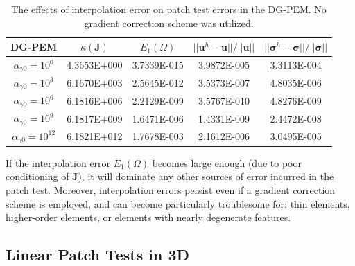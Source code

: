 \begin{table}[!ht]
  \begin{center}
    \begin{tabular}{| c || c | c | c | c |}
    \hline
    DG-PEM & $\kappa(\mathbf{J})$ &  $E_1 (\Omega)$ & $||\mathbf{u}^h - \mathbf{u}|| / ||\mathbf{u}||$ & $||\boldsymbol{\sigma}^h - \boldsymbol{\sigma}|| / ||\boldsymbol{\sigma}||$ \\ \hline \hline
    $\alpha_{\gamma0} = 10^{0}$ & 4.3653E+000 & 3.7339E-015 & 3.9872E-005 & 3.3113E-004 \\ \hline
    $\alpha_{\gamma0} = 10^{3}$ & 6.1670E+003 & 2.5645E-012 & 3.5373E-007 & 4.8035E-006 \\ \hline
    $\alpha_{\gamma0} = 10^{6}$ & 6.1816E+006 & 2.2129E-009 & 3.5767E-010 & 4.8276E-009 \\ \hline
    $\alpha_{\gamma0} = 10^{9}$ & 6.1817E+009 & 1.6471E-006 & 1.4331E-009 & 2.4472E-008 \\ \hline
    $\alpha_{\gamma0} = 10^{12}$ & 6.1821E+012 & 1.7678E-003 & 2.1612E-006 & 3.0495E-005 \\
    \hline
    \end{tabular}
    \caption{The effects of interpolation error on patch test errors in the DG-PEM. No gradient correction scheme was utilized.}
    \vspace{-5pt}
    \label{tab:interpolation_patch_test_error}
    \vspace{-10pt}
  \end{center}
\end{table}

If the interpolation error $E_1 (\Omega)$ becomes large enough (due to poor conditioning of $\mathbf{J}$), it will dominate any other sources of error incurred in the patch test. Moreover, interpolation errors persist even if a gradient correction scheme is employed, and can become particularly troublesome for: thin elements, higher-order elements, or elements with nearly degenerate features.

\subsection*{Linear Patch Tests in 3D}

